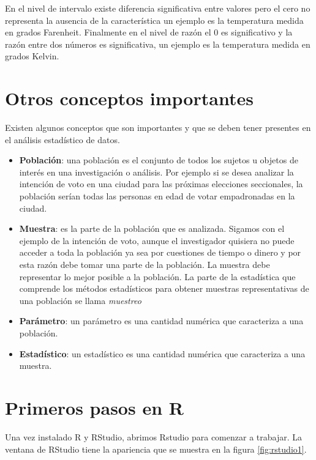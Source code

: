 \documentclass[]{book}
\providecommand{\tightlist}{%
  \setlength{\itemsep}{0pt}\setlength{\parskip}{0pt}}
\begin{document}
En el nivel de intervalo existe diferencia significativa entre valores pero el cero no representa la ausencia de la característica un ejemplo es la temperatura medida en grados Farenheit. Finalmente en el nivel de razón el 0 es significativo y la razón entre dos números es significativa, un ejemplo es la temperatura medida en grados Kelvin.

\hypertarget{otros-conceptos-importantes}{%
\section{Otros conceptos importantes}\label{otros-conceptos-importantes}}

Existen algunos conceptos que son importantes y que se deben tener presentes en el análisis estadístico de datos.

\begin{itemize}
\tightlist
\item
  \textbf{Población}: una población es el conjunto de todos los sujetos u objetos de interés en una investigación o análisis. Por ejemplo si se desea analizar la intención de voto en una ciudad para las próximas elecciones seccionales, la población serían todas las personas en edad de votar empadronadas en la ciudad.
\item
  \textbf{Muestra}: es la parte de la población que es analizada. Sigamos con el ejemplo de la intención de voto, aunque el investigador quisiera no puede acceder a toda la población ya sea por cuestiones de tiempo o dinero y por esta razón debe tomar una parte de la población. La muestra debe representar lo mejor posible a la población. La parte de la estadística que comprende los métodos estadísticos para obtener muestras representativas de una población se llama \emph{muestreo}
\item
  \textbf{Parámetro}: un parámetro es una cantidad numérica que caracteriza a una población.
\item
  \textbf{Estadístico}: un estadístico es una cantidad numérica que caracteriza a una muestra.
\end{itemize}

\hypertarget{primerR}{%
\section{Primeros pasos en R}\label{primerR}}

Una vez instalado R y RStudio, abrimos Rstudio para comenzar a trabajar. La ventana de RStudio tiene la apariencia que se muestra en la figura \ref{fig:rstudio1}.
\end{document}
